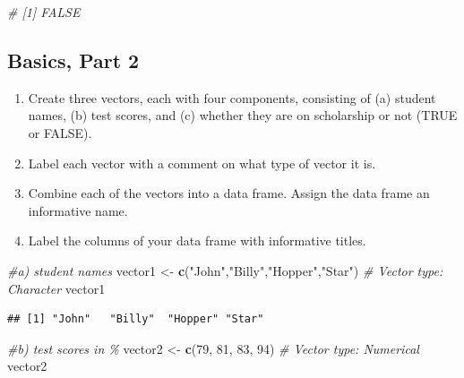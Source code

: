 \documentclass[
]{article}
\newenvironment{Shaded}{\begin{snugshade}}{\end{snugshade}}
\newcommand{\CommentTok}[1]{\textcolor[rgb]{0.56,0.35,0.01}{\textit{#1}}}
\newcommand{\DecValTok}[1]{\textcolor[rgb]{0.00,0.00,0.81}{#1}}
\newcommand{\FunctionTok}[1]{\textcolor[rgb]{0.13,0.29,0.53}{\textbf{#1}}}
\newcommand{\NormalTok}[1]{#1}
\newcommand{\OtherTok}[1]{\textcolor[rgb]{0.56,0.35,0.01}{#1}}
\newcommand{\StringTok}[1]{\textcolor[rgb]{0.31,0.60,0.02}{#1}}
\begin{document}
\begin{Shaded}
\begin{Highlighting}[]
\CommentTok{\# [1] FALSE}
\end{Highlighting}
\end{Shaded}

\subsection{Basics, Part 2}\label{basics-part-2}

\begin{enumerate}
\def\labelenumi{\arabic{enumi}.}
\setcounter{enumi}{4}
\item
  Create three vectors, each with four components, consisting of (a)
  student names, (b) test scores, and (c) whether they are on
  scholarship or not (TRUE or FALSE).
\item
  Label each vector with a comment on what type of vector it is.
\item
  Combine each of the vectors into a data frame. Assign the data frame
  an informative name.
\item
  Label the columns of your data frame with informative titles.
\end{enumerate}

\begin{Shaded}
\begin{Highlighting}[]
\CommentTok{\#a) student names}
\NormalTok{vector1 }\OtherTok{\textless{}{-}} \FunctionTok{c}\NormalTok{(}\StringTok{"John"}\NormalTok{,}\StringTok{"Billy"}\NormalTok{,}\StringTok{"Hopper"}\NormalTok{,}\StringTok{"Star"}\NormalTok{) }\CommentTok{\# Vector type: Character}
\NormalTok{vector1}
\end{Highlighting}
\end{Shaded}

\begin{verbatim}
## [1] "John"   "Billy"  "Hopper" "Star"
\end{verbatim}

\begin{Shaded}
\begin{Highlighting}[]
\CommentTok{\#b) test scores in \%}
\NormalTok{vector2 }\OtherTok{\textless{}{-}} \FunctionTok{c}\NormalTok{(}\DecValTok{79}\NormalTok{, }\DecValTok{81}\NormalTok{, }\DecValTok{83}\NormalTok{, }\DecValTok{94}\NormalTok{) }\CommentTok{\# Vector type: Numerical}
\NormalTok{vector2}
\end{Highlighting}
\end{Shaded}
\end{document}

